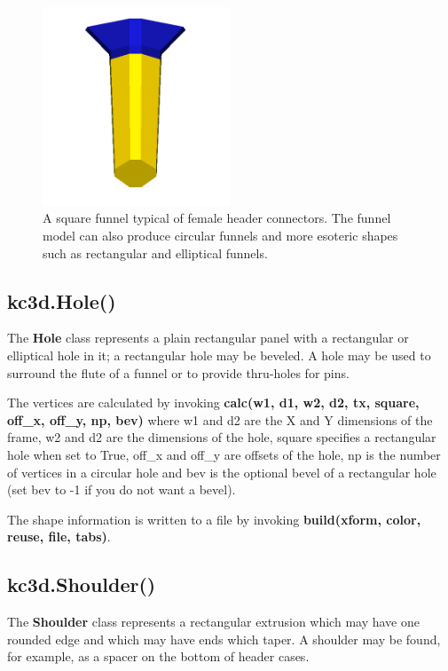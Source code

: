 \begin{figure}
\label{fig:k3dtools-funnel}
\centering
\includegraphics[width = 0.5\textwidth]{img/k3dtools-funnel.png}
\caption{A square funnel typical of female header connectors. The funnel model
can also produce circular funnels and more esoteric shapes such as rectangular
and elliptical funnels.}
\end{figure}

\subsection{kc3d.Hole()}
The \textbf{Hole} class represents a plain rectangular panel with a rectangular or elliptical
hole in it; a rectangular hole may be beveled. A hole may be used to surround the flute of a
funnel or to provide thru-holes for pins.

The vertices are calculated by invoking \textbf{calc(w1, d1, w2, d2, tx, square, off\_x, off\_y, np, bev)}
where w1 and d2 are the X and Y dimensions of the frame, w2 and d2 are the dimensions of the
hole, square specifies a rectangular hole when set to True, off\_x and off\_y are offsets of
the hole, np is the number of vertices in a circular hole and bev is the optional bevel of
a rectangular hole (set bev to -1 if you do not want a bevel).

The shape information is written to a file by invoking \textbf{build(xform, color, reuse, file, tabs)}.

\subsection{kc3d.Shoulder()}
The \textbf{Shoulder} class represents a rectangular extrusion which may have one rounded edge
and which may have ends which taper. A shoulder may be found, for example, as a spacer on the
bottom of header cases.

